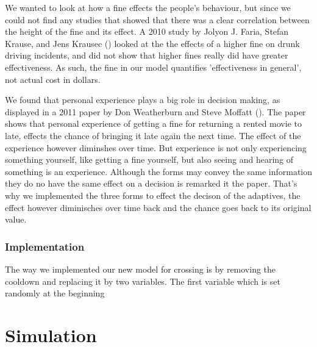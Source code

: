 \documentclass[a4paper]{article}
\begin{document}
We wanted to look at how a fine effects the people's behaviour, but since we could not find any studies that showed that there was a clear correlation between the height of the fine and its effect. A 2010 study by Jolyon J. Faria, Stefan Krause, and Jens Krausec (\cite{drunkdrivers}) looked at the the effects of a higher fine on drunk driving incidents, and did not show that higher fines really did have greater effectiveness. As such, the fine in our model quantifies 'effectiveness in general', not actual cost in dollars. 

We found that personal experience plays a big role in decision making, as displayed in a 2011 paper by Don Weatherburn and Steve Moffatt (\cite{movies}). The paper shows that personal experience of getting a fine for returning a rented movie to late, effects the chance of bringing it late again the next time. The effect of the experience however diminshes over time. But experience is not only experiencing something yourself, like getting a fine yourself, but also seeing and hearing of something is an experience. Although the forms may convey the same information they do no have the same effect on a decision is remarked it the paper. That's why we implemented the three forms to effect the decison of the adaptives, the effect however diminisches over time back and the chance goes back to its original value.

\subsubsection{Implementation}

The way we implemented our new model for crossing is by removing the cooldown and replacing it by two variables. The first variable which is set randomly at the beginning 

\clearpage

\section{Simulation}
\end{document}
